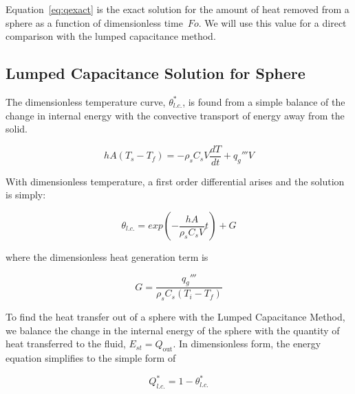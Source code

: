 Equation~\ref{eq:qexact} is the exact solution for the amount of heat removed from a sphere as a function of dimensionless time~$Fo$. We will use this value for a direct comparison with the lumped capacitance method.




\subsection{Lumped Capacitance Solution for Sphere}
The dimensionless temperature curve, $\theta_{l.c.}^*$, is found from a simple balance of the change in internal energy with the convective transport of energy away from the solid.  

\begin{equation}
	hA(T_s-T_f)=-\rho_sC_sV\frac{dT}{dt} + q_g'''V
\end{equation}

With dimensionless temperature, a first order differential arises and the solution is simply:

\begin{equation}
\label{eq:thetalc}
	\theta_{l.c.}=exp\left(-\frac{hA}{\rho_s C_s V}t\right) + G
\end{equation}

where the dimensionless heat generation term is 

\begin{equation}
	G = \frac{q_g'''}{\rho_sC_s(T_{i}-T_{f})}
\end{equation}

To find the heat transfer out of a sphere with the Lumped Capacitance Method, we balance the change in the internal energy of the sphere with the quantity of heat transferred to the fluid, $E_{st} = Q_{\text{out}}$. In dimensionless form, the energy equation simplifies to the simple form of

\begin{equation}
	Q^*_{l.c.}=1-\theta^*_{l.c.}
\label{eq:qlc}
\end{equation}



